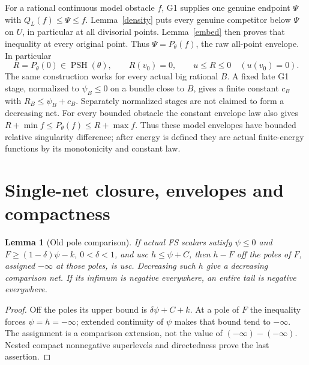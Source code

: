 \documentclass[10pt]{article}
\newtheorem{lemma}[theorem]{Lemma}
\newcommand{\PSH}{\operatorname{PSH}}
\begin{document}
For a rational continuous model obstacle $f$, G1 supplies one genuine
endpoint $\Psi$ with $Q_L(f)\leq\Psi\leq f$. Lemma~\ref{density}
puts every genuine competitor below $\Psi$ on $U$, in particular at all
divisorial points. Lemma~\ref{embed} then proves that inequality at every
original point. Thus $\Psi=P_\theta(f)$, the raw all-point envelope.
In particular
\[
 R=P_\theta(0)\in\PSH(\theta),\qquad R(v_0)=0,
 \qquad u\leq R\leq0\quad(u(v_0)=0).
 \tag{2.3}
\]
The same construction works for every actual big rational $B$.
A fixed late G1 stage, normalized to $\psi_B\leq0$ on a bundle close
to $B$, gives a finite constant $c_B$ with $R_B\leq\psi_B+c_B$.
Separately normalized stages are not claimed to form a decreasing net.
For every bounded obstacle the constant envelope law also gives
$R+\min f\leq P_\theta(f)\leq R+\max f$. Thus these model envelopes
have bounded relative singularity difference; after energy is defined
they are actual finite-energy functions by its monotonicity and constant law.

\section{Single-net closure, envelopes and compactness}
\begin{lemma}[Old pole comparison]\label{pole}
If actual FS scalars satisfy $\psi\leq0$ and
$F\geq(1-\delta)\psi-k$, $0<\delta<1$, and usc $h\leq\psi+C$,
then $h-F$ off the poles of $F$, assigned $-\infty$ at those poles,
is usc. Decreasing such $h$ give a decreasing comparison net. If its
infimum is negative everywhere, an entire tail is negative everywhere.
\end{lemma}
\begin{proof}
Off the poles its upper bound is $\delta\psi+C+k$. At a pole of $F$
the inequality forces $\psi=h=-\infty$; extended continuity of $\psi$
makes that bound tend to $-\infty$. The assignment is a comparison
extension, not the value of $(-\infty)-(-\infty)$. Nested compact
nonnegative superlevels and directedness prove the last assertion.
\end{proof}
\end{document}
